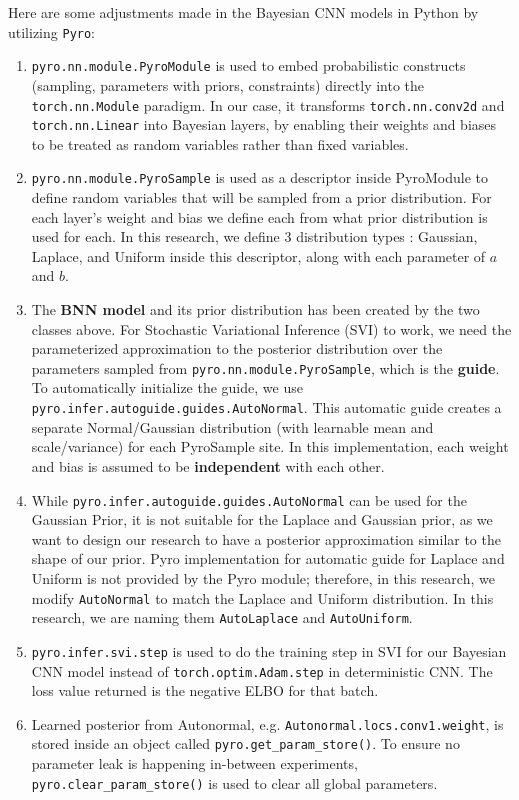 \documentclass[ %
                    author={Revalda Putawara},
                supervisor={Dr. James Pope},
                    degree={MSc},
                     title={Robustness of Bayesian Neural Networks Design Choices Against Weight and Bias Perturbation Induced by Single Event Upsets (SEUs)},
                      type={},
                      year={2025}]{dissertation}
\begin{document}
Here are some adjustments made in the Bayesian CNN models in Python by utilizing \texttt{Pyro}:
\begin{enumerate}
\item \texttt{pyro.nn.module.PyroModule} is used to embed probabilistic constructs (sampling, parameters with priors, constraints) directly into the \texttt{torch.nn.Module} paradigm. In our case, it transforms \texttt{torch.nn.conv2d} and \texttt{torch.nn.Linear} into Bayesian layers, by enabling their weights and biases to be treated as random variables rather than fixed variables.
\item \texttt{pyro.nn.module.PyroSample} is used as a descriptor inside PyroModule to define random variables that will be sampled from a prior distribution. For each layer's weight and bias we define each from what prior distribution is used for each. In this research, we define 3 distribution types : Gaussian, Laplace, and Uniform inside this descriptor, along with each parameter of $a$ and $b$.
\item The \textbf{BNN model} and its prior distribution has been created by the two classes above. For Stochastic Variational Inference (SVI) to work, we need the parameterized approximation to the posterior distribution over the parameters sampled from \texttt{pyro.nn.module.PyroSample}, which is the \textbf{guide}. To automatically initialize the guide, we use \texttt{pyro.infer.autoguide.guides.AutoNormal}. This automatic guide creates a separate Normal/Gaussian distribution (with learnable mean and scale/variance) for each PyroSample site. In this implementation, each weight and bias is assumed to be \textbf{independent} with each other.
\item While \texttt{pyro.infer.autoguide.guides.AutoNormal} can be used for the Gaussian Prior, it is not suitable for the Laplace and Gaussian prior, as we want to design our research to have a posterior approximation similar to the shape of our prior. Pyro implementation for automatic guide for Laplace and Uniform is not provided by the Pyro module; therefore, in this research, we modify \texttt{AutoNormal} to match the Laplace and Uniform distribution. In this research, we are naming them \texttt{AutoLaplace} and \texttt{AutoUniform}.
\item \texttt{pyro.infer.svi.step} is used to do the training step in SVI for our Bayesian CNN model instead of \texttt{torch.optim.Adam.step} in deterministic CNN. The loss value returned is the negative ELBO for that batch.
\item Learned posterior from Autonormal, e.g. \texttt{Autonormal.locs.conv1.weight}, is stored inside an object called \texttt{pyro.get\_param\_store()}. To ensure no parameter leak is happening in-between experiments, \texttt{pyro.clear\_param\_store()} is used to clear all global parameters.

\end{enumerate}
\end{document}
